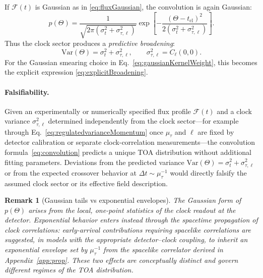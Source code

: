 \documentclass[pdflatex,sn-mathphys-num]{sn-jnl}
\theoremstyle{thmstylethree}
\theoremstyle{thmstyleone}
\theoremstyle{thmstyletwo}
\newtheorem{remark}{Remark}[section]
\numberwithin{equation}{section}
\newcommand{\F}{\mathcal{F}}
\begin{document}
        If $\F(t)$ is Gaussian as in \eqref{eq:fluxGaussian}, the convolution is again Gaussian:
        \begin{equation}
            p(\Theta)=\frac{1}{\sqrt{2\pi(\sigma_t^2+\sigma_{\tau,\ell}^2)}}
            \exp\!\left[-\frac{(\Theta-t_{\mathrm{cl}})^2}{2(\sigma_t^2+\sigma_{\tau,\ell}^2)}\right].
            \label{eq:pGaussian}
        \end{equation}
        Thus the clock sector produces a \emph{predictive broadening}:
        \begin{equation}
            \mathrm{Var}(\Theta)=\sigma_t^2+\sigma_{\tau,\ell}^2,
            \qquad
            \sigma_{\tau,\ell}^2=C_\ell(0,0).
            \label{eq:varianceAddition}
        \end{equation}
        For the Gaussian smearing choice in Eq.~\eqref{eq:gaussianKernelWeight}, this becomes the explicit expression \eqref{eq:explicitBroadening}.

        \paragraph{Falsifiability.}
            Given an experimentally or numerically specified flux profile $\mathcal{F}(t)$ and a clock variance $\sigma_{\tau,\ell}^2$ determined independently from the clock sector---for example through Eq.~\eqref{eq:regulatedvarianceMomentum} once $\mu_\tau$ and $\ell$ are fixed by detector calibration or separate clock-correlation measurements---the convolution formula~\eqref{eq:convolution} predicts a unique TOA distribution without additional fitting parameters. Deviations from the predicted variance $\mathrm{Var}(\Theta)=\sigma_t^2+\sigma_{\tau,\ell}^2$ or from the expected crossover behavior at $\Delta t\sim\mu_\tau^{-1}$ would directly falsify the assumed clock sector or its effective field description.

            \begin{remark}[Gaussian tails vs exponential envelopes]
The Gaussian form of $p(\Theta)$ arises from the \emph{local, one-point} statistics of the clock readout at the detector. Exponential behavior enters instead through the \emph{spacetime propagation} of clock correlations: early-arrival contributions requiring spacelike correlations are suggested, in models with the appropriate detector--clock coupling, to inherit an exponential \emph{envelope} set by $\mu_\tau^{-1}$ from the spacelike correlator derived in Appendix~\ref{app:prop}. These two effects are conceptually distinct and govern different regimes of the TOA distribution.
            \end{remark}
\end{document}
